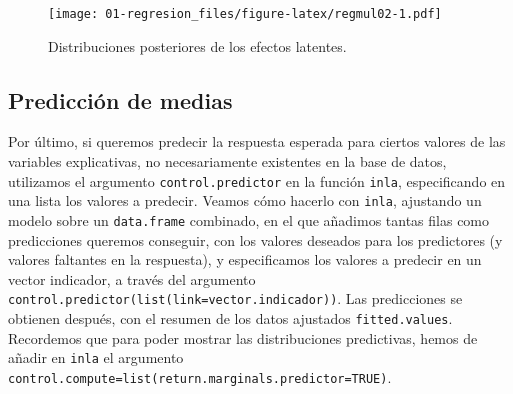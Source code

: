 \documentclass[
]{book}
\begin{document}
\begin{figure}
\centering
\texttt{[image: 01-regresion\_files/figure-latex/regmul02-1.pdf]}
\caption{\label{fig:regmul02}Distribuciones posteriores de los efectos latentes.}
\end{figure}

\hypertarget{predicciuxf3n-de-medias}{%
\subsection{Predicción de medias}\label{predicciuxf3n-de-medias}}

Por último, si queremos predecir la respuesta esperada para ciertos valores de las variables explicativas, no necesariamente existentes en la base de datos, utilizamos el argumento \texttt{control.predictor} en la función \texttt{inla}, especificando en una lista los valores a predecir. Veamos cómo hacerlo con \texttt{inla}, ajustando un modelo sobre un \texttt{data.frame} combinado, en el que añadimos tantas filas como predicciones queremos conseguir, con los valores deseados para los predictores (y valores faltantes en la respuesta), y especificamos los valores a predecir en un vector indicador, a través del argumento \texttt{control.predictor(list(link=vector.indicador))}. Las predicciones se obtienen después, con el resumen de los datos ajustados \texttt{fitted.values}. Recordemos que para poder mostrar las distribuciones predictivas, hemos de añadir en \texttt{inla} el argumento \texttt{control.compute=list(return.marginals.predictor=TRUE)}.
\end{document}
